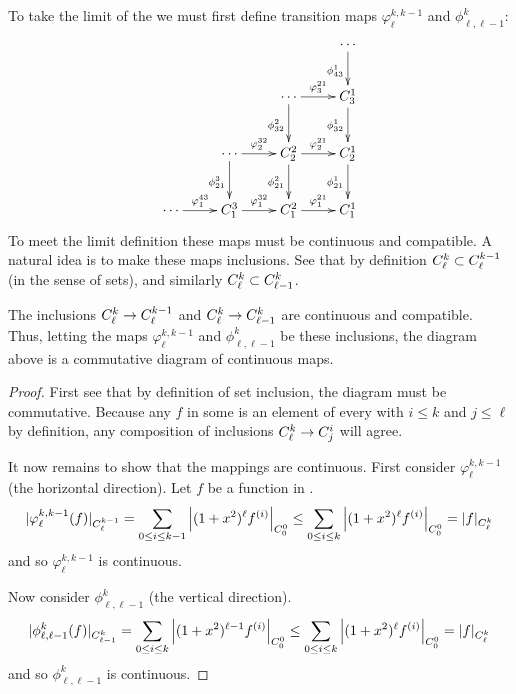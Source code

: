       To take the limit of the \Ckl we must first define transition maps $\varphi^{k,k-1}_\ell$ and $\phi^k_{\ell,\ell-1}$:
      \begin{displaymath}
        \xymatrix{
          &&& \cdots \ar[d]_{\phi^1_{43}}\\
          && \cdots \ar[d]_{\phi^2_{32}} \ar[r]^{\varphi^{21}_3} & C^1_3 \ar[d]_{\phi^1_{32}}\\
          & \cdots \ar[d]_{\phi^3_{21}} \ar[r]^{\varphi^{32}_2} & C^2_2 \ar[d]_{\phi^2_{21}} \ar[r]^{\varphi^{21}_2} & C^1_2 \ar[d]_{\phi^1_{21}}\\
          \cdots \ar[r]^{\varphi^{43}_1} & C^3_1 \ar[r]^{\varphi^{32}_1} & C^2_1 \ar[r]^{\varphi^{21}_1} & C^1_1
        }
      \end{displaymath}
      To meet the limit definition these maps must be continuous and compatible.
      A natural idea is to make these maps inclusions.
      See that by definition ${C^k_\ell}\subset{C^{k-1}_\ell}$ (in the sense of sets), and similarly ${C^k_\ell}\subset C^k_{\ell-1}$.
      \begin{claim}
        \label{claim:inclcont}
        The inclusions ${C^k_\ell}\rightarrow {C^{k-1}_\ell}$ and ${C^k_\ell}\rightarrow C^k_{\ell-1}$ are continuous and compatible.
        Thus, letting the maps $\varphi^{k,k-1}_\ell$ and $\phi^k_{\ell,\ell-1}$ be these inclusions, the diagram above is a commutative diagram of continuous maps.
      \end{claim}
      \begin{proof}
        First see that by definition of set inclusion, the diagram must be commutative.
        Because any $f$ in some \Ckl is an element of every \Cij with $i\le k$ and $j\le\ell$ by definition, any composition of inclusions ${C^k_\ell}\rightarrow{C^i_j}$ will agree.

        It now remains to show that the mappings are continuous.
        First consider $\varphi^{k,k-1}_\ell$ (the horizontal direction).
        Let $f$ be a function in \Ckl.
        \begin{align*}
          |\varphi^{k,k-1}_\ell(f)|_{C^{k-1}_\ell}
          = \sum_{0\le i \le k-1} \left|(1+x^2)^\ell f^{(i)}\right|_{C^0_0}
          \le \sum_{0\le i \le k} \left|(1+x^2)^\ell f^{(i)}\right|_{C^0_0}
          = |f|_{C^k_\ell}
        \end{align*}
        and so $\varphi^{k,k-1}_\ell$ is continuous.

        Now consider $\phi^k_{\ell,\ell-1}$ (the vertical direction).
        \begin{align*}
          |\phi^k_{\ell,\ell-1}(f)|_{C^k_{\ell-1}}
          = \sum_{0\le i \le k} \left|(1+x^2)^{\ell-1} f^{(i)}\right|_{C^0_0}
          \le \sum_{0\le i \le k} \left|(1+x^2)^{\ell} f^{(i)}\right|_{C^0_0}
          = |f|_{C^k_\ell}
        \end{align*}
        and so $\phi^k_{\ell,\ell-1}$ is continuous.
      \end{proof}
